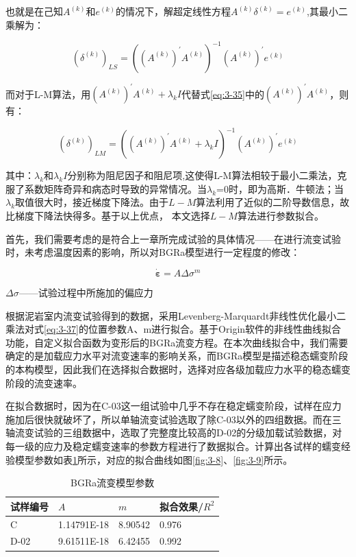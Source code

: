 也就是在己知$A^{(k)}$和$e^{(k)}$的情况下，解超定线性方程$A^{(k)}\delta^{(k)}=e^{(k)}$,其最小二乘解为：

\begin{equation}
    \label{eq:3-35}
    (\delta^{(k)})_{LS}=((A^{(k)})^{'}A^{(k)})^{-1}(A^{(k)})^{'}e^{(k)}
\end{equation}

而对于L-M算法，用$(A^{(k)})^{'}A^{(k)}+{\lambda_k}I$代替式\ref{eq:3-35}中的$(A^{(k)})^{'}A^{(k)}$，则有：

\begin{equation}
    (\delta^{(k)})_{LM}=((A^{(k)})^{'}A^{(k)}+{\lambda_k}I)^{-1}(A^{(k)})^{'}e^{(k)}
\end{equation}

其中：$\lambda_k$和${\lambda_k}I$分别称为阻尼因子和阻尼项,这使得L-M算法相较于最小二乘法，克服了系数矩阵奇异和病态时导致的异常情况。当$\lambda_k$=0时，即为高斯．牛顿法；当$\lambda_k$取值很大时，接近梯度下降法。由于$L-M$算法利用了近似的二阶导数信息，故比梯度下降法快得多。基于以上优点，
本文选择$L-M$算法进行参数拟合。

首先，我们需要考虑的是符合上一章所完成试验的具体情况——在进行流变试验时，未考虑温度因素的影响，所以对BGRa模型进行一定程度的修改：

\begin{equation}
    \dot{\boldsymbol{\varepsilon}}=A\Delta\sigma^m
    \label{eq:3-37}
\end{equation}

$\Delta\sigma$——试验过程中所施加的偏应力

根据泥岩室内流变试验得到的数据，采用Levenberg-Marquardt非线性优化最小二乘法对式\ref{eq:3-37}的位置参数A、m进行拟合。基于Origin软件的非线性曲线拟合功能，自定义拟合函数为变形后的BGRa流变方程。在本次曲线拟合中，我们需要确定的是加载应力水平对流变速率的影响关系，而BGRa模型是描述稳态蠕变阶段的本构模型，因此我们在选择拟合数据时，选择对应各级加载应力水平的稳态蠕变阶段的流变速率。

在拟合数据时，因为在C-03这一组试验中几乎不存在稳定蠕变阶段，试样在应力施加后很快就破坏了，所以单轴流变试验选取了除C-03以外的四组数据。而在三轴流变试验的三组数据中，选取了完整度比较高的D-02的分级加载试验数据，对每一级的应力及稳定蠕变速率的参数方程进行了数据拟合。计算出各试样的蠕变经验模型参数如表\ref{tab:单、三轴试验BGRa流变模型参数}所示，对应的拟合曲线如图\ref{fig:3-8}、\ref{fig:3-9}所示。

\begin{table}[ht!]\small
    \begin{tabular}{p{3cm}<{\centering} p{3cm}<{\centering} p{3cm}<{\centering} p{3cm}<{\centering}}
        \toprule
        试样编号  & $A$  &  $m$   & 拟合效果/$R^2$\\
        \midrule
           C     &   1.14791E-18   &    8.90542   &   0.976\\
        \midrule
        D-02    &   9.61511E-18   &    6.42455   &   0.992 \\
        \bottomrule
    \end{tabular}
    \caption{BGRa流变模型参数}
    \label{tab:单、三轴试验BGRa流变模型参数}
\end{table}


